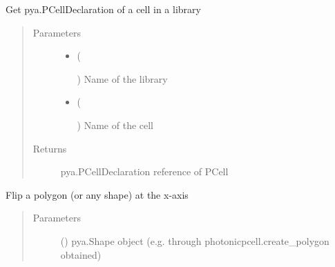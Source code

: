 \documentclass[a4paper,10pt,english]{sphinxmanual}
\begin{document}
\begin{fulllineitems}

\begin{fulllineitems}
\label{\detokenize{photonics/photonics:kppc.photonics.PhotDevice.decl}}
Get pya.PCellDeclaration of a cell in a library
\begin{quote}\begin{description}
\item[{Parameters}] \leavevmode\begin{itemize}
\item {} 
 (%
\begin{footnote}[56]\sphinxAtStartFootnote
{}
%
\end{footnote}) \textendash{} Name of the library

\item {} 
 (%
\begin{footnote}[57]\sphinxAtStartFootnote
{}
%
\end{footnote}) \textendash{} Name of the cell

\end{itemize}

\item[{Returns}] \leavevmode
pya.PCellDeclaration reference of PCell

\end{description}\end{quote}

\end{fulllineitems}


\begin{fulllineitems}
\label{\detokenize{photonics/photonics:kppc.photonics.PhotDevice.flip_shape_xaxis}}
Flip a polygon (or any shape) at the x-axis
\begin{quote}\begin{description}
\item[{Parameters}] \leavevmode
{} () \textendash{} pya.Shape object (e.g. through photonicpcell.create\_polygon obtained)


\end{description}
\end{quote}
\end{fulllineitems}
\end{fulllineitems}
\end{document}
